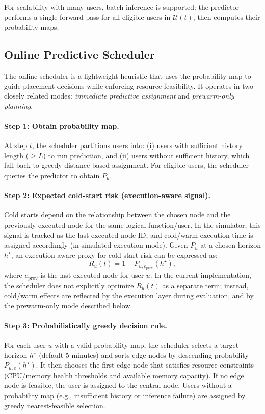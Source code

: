 For scalability with many users, batch inference is supported: the predictor performs a single forward pass for all eligible users in \(\mathcal{U}(t)\), then computes their probability maps.

\subsection{Online Predictive Scheduler}
\label{subsec:online_scheduler}

The online scheduler is a lightweight heuristic that uses the probability map to guide placement decisions while enforcing resource feasibility. It operates in two closely related modes: \emph{immediate predictive assignment} and \emph{prewarm-only planning}.

\paragraph{Step 1: Obtain probability map.}
At step \(t\), the scheduler partitions users into:
(i) users with sufficient history length (\(\geq L\)) to run prediction, and
(ii) users without sufficient history, which fall back to greedy distance-based assignment.
For eligible users, the scheduler queries the predictor to obtain \(P_u\).

\paragraph{Step 2: Expected cold-start risk (execution-aware signal).}
Cold starts depend on the relationship between the chosen node and the previously executed node for the same logical function/user. In the simulator, this signal is tracked as the last executed node ID, and cold/warm execution time is assigned accordingly (in simulated execution mode).
Given \(P_u\) at a chosen horizon \(h^\star\), an execution-aware proxy for cold-start risk can be expressed as:
\[
R_u(t) = 1 - P_{u,e_{\text{prev}}}(h^\star),
\]
where \(e_{\text{prev}}\) is the last executed node for user \(u\). In the current implementation, the scheduler does not explicitly optimize \(R_u(t)\) as a separate term; instead, cold/warm effects are reflected by the execution layer during evaluation, and by the prewarm-only mode described below.

\paragraph{Step 3: Probabilistically greedy decision rule.}
For each user \(u\) with a valid probability map, the scheduler selects a target horizon \(h^\star\) (default 5 minutes) and sorts edge nodes by descending probability \(P_{u,e}(h^\star)\). It then chooses the first edge node that satisfies resource constraints (CPU/memory health thresholds and available memory capacity). If no edge node is feasible, the user is assigned to the central node. Users without a probability map (e.g., insufficient history or inference failure) are assigned by greedy nearest-feasible selection.

